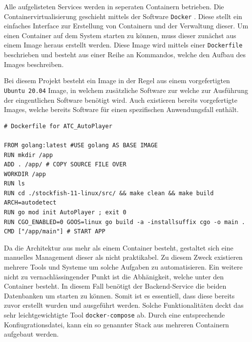 Alle aufgelisteten Services werden in seperaten Containern betrieben.
Die Containervirtualisierung geschieht mittels der Software
\passthrough{\lstinline!Docker!} \cite{docker}. Diese stellt ein
einfaches Interface zur Erstellung von Containern und der Verwaltung
dieser. Um einen Container auf dem System starten zu können, muss dieser
zunächst aus einem Image heraus erstellt werden. Diese Image wird
mittels einer \passthrough{\lstinline!Dockerfile!} beschrieben und
besteht aus einer Reihe an Kommandos, welche den Aufbau des Images
beschreiben.

Bei diesem Projekt besteht ein Image in der Regel aus einem
vorgefertigten \passthrough{\lstinline!Ubuntu 20.04!} Image, in welchem
zusätzliche Software zur welche zur Ausführung der eingentlichen
Software benötigt wird. Auch existieren bereits vorgefertigte Images,
welche bereits Software für einen spezifischen Anwendungsfall enthält.

\begin{lstlisting}
# Dockerfile for ATC_AutoPlayer

FROM golang:latest #USE golang AS BASE IMAGE
RUN mkdir /app
ADD . /app/ # COPY SOURCE FILE OVER
WORKDIR /app
RUN ls
RUN cd ./stockfish-11-linux/src/ && make clean && make build ARCH=autodetect
RUN go mod init AutoPlayer ; exit 0
RUN CGO_ENABLED=0 GOOS=linux go build -a -installsuffix cgo -o main .
CMD ["/app/main"] # START APP
\end{lstlisting}

Da die Architektur aus mehr als einem Container besteht, gestaltet sich
eine manuelles Management dieser als nicht praktikabel. Zu diesem Zweck
existieren mehrere Tools und Systeme um solche Aufgaben zu
automatisieren. Ein weitere nicht zu vernachlässingender Punkt ist die
Abhänigkeit, welche unter den Container besteht. In diesem Fall benötigt
der Backend-Service die beiden Datenbanken um starten zu können. Somit
ist es essentiell, dass diese bereits zuvor erstellt wurden und
ausgeführt werden. Solche Funktionalitäten deckt das sehr
leichtgewichtigte Tool \passthrough{\lstinline!docker-compose!}
\cite{dockercompose} ab. Durch eine entsprechende
Konfiugrationsdatei, kann ein so genannter Stack aus mehreren Containern
aufgebaut werden.

